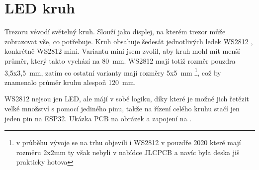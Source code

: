 \section{LED kruh}
\label{WS2812}

Trezoru vévodí světelný kruh. Slouží jako displej, na kterém trezor může zobrazovat vše, co potřebuje. Kruh obsahuje šedesát jednotlivých ledek 
\href{https://cdn-shop.adafruit.com/datasheets/WS2812B.pdf}{WS2812} \parencite{WS2812}, konkrétně WS2812 mini. Variantu mini jsem zvolil, aby kruh mohl mít menší
průměr, který takto vychází na 80~mm. WS2812 mají totiž rozměr pouzdra 3,5x3,5~mm, zatím co ostatní varianty mají rozměry 5x5~mm \footnote{v průběhu vývoje se na trhu 
objevili i WS2812 v pouzdře 2020 které mají rozměru 2x2mm ty však nebyli v nabídce JLCPCB a navíc byla deska jiš prakticky hotova}, což by znamenalo průměr kruhu alespoň 120~mm.

WS2812 nejsou jen LED, ale májí v sobě logiku, díky které je možné jich řetězit velké množství s pomocí jediného pinu, takže na řízení celého kruhu stačí jen jeden pin na ESP32.\newline
Ukázka PCB na obrázek  a zapojení na .

\newpage